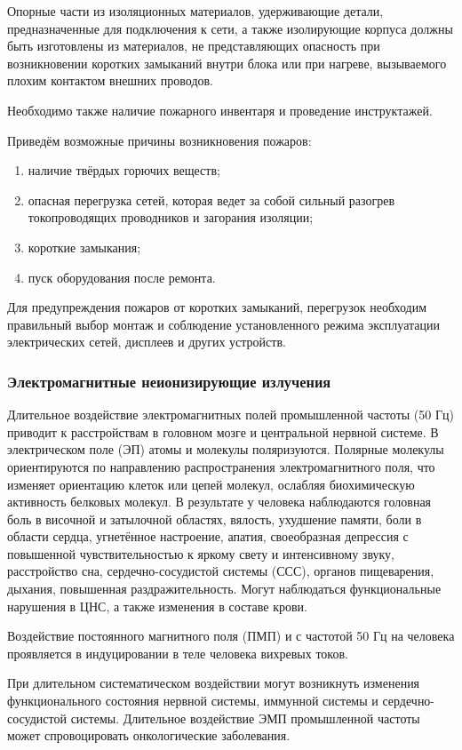Опорные части из изоляционных материалов, удерживающие детали, предназначенные для подключения к сети, а также изолирующие корпуса должны быть изготовлены из материалов, не представляющих опасность при возникновении коротких замыканий внутри блока или при нагреве, вызываемого плохим контактом внешних проводов.

Необходимо также наличие пожарного инвентаря и проведение инструктажей.

Приведём возможные причины возникновения пожаров:
\begin{enumerate}
\item наличие твёрдых горючих веществ;
\item опасная перегрузка сетей, которая ведет за собой сильный разогрев токопроводящих проводников и загорания изоляции;
\item короткие замыкания;
\item пуск оборудования после ремонта.
\end{enumerate}
Для предупреждения пожаров от коротких замыканий, перегрузок необходим правильный выбор монтаж и соблюдение установленного режима эксплуатации электрических сетей, дисплеев и других устройств.
\subsubsection{Электромагнитные неионизирующие излучения}

Длительное воздействие электромагнитных полей промышленной частоты (50 Гц) приводит к расстройствам в головном мозге и центральной нервной системе. В электрическом поле (ЭП) атомы и молекулы поляризуются.
Полярные молекулы ориентируются по направлению распространения электромагнитного поля, что изменяет ориентацию клеток или цепей молекул, ослабляя биохимическую активность белковых молекул.
В результате у человека наблюдаются головная боль в височной и затылочной областях, вялость, ухудшение памяти, боли в области сердца, угнетённое настроение, апатия, своеобразная депрессия с повышенной чувствительностью к яркому свету и интенсивному звуку, расстройство сна, сердечно-сосудистой системы (ССС), органов пищеварения, дыхания, повышенная раздражительность.
Могут наблюдаться функциональные нарушения в ЦНС, а также изменения в составе крови.

Воздействие постоянного магнитного поля (ПМП) и с частотой 50 Гц на человека проявляется в индуцировании в теле человека вихревых токов.

При длительном систематическом воздействии могут возникнуть изменения функционального состояния нервной системы, иммунной системы и сердечно-сосудистой системы. Длительное воздействие ЭМП промышленной частоты может спровоцировать онкологические заболевания.

